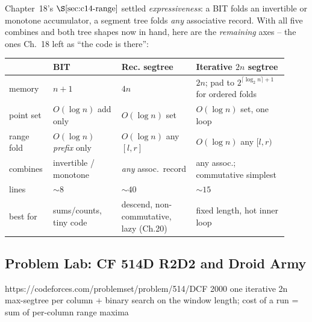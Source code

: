 \begin{comparisonbox}
Chapter~18's \(\secref{c14-range}\) settled \emph{expressiveness}: a BIT folds an
invertible or monotone accumulator, a segment tree folds \emph{any} associative
record.  With all five combines and both tree shapes now in hand, here are the
\emph{remaining} axes -- the ones Ch.~18 left as ``the code is there'':
\begin{center}\renewcommand{\arraystretch}{1.2}\footnotesize
\begin{tabular}{@{}p{0.115\linewidth} p{0.235\linewidth} p{0.255\linewidth} p{0.31\linewidth}@{}}
\toprule
 & \textbf{BIT} & \textbf{Rec. segtree} & \textbf{Iterative \(2n\) segtree}\\
\midrule
memory    & \(n{+}1\) & \(4n\) & \(2n\); pad to \(2^{\lceil\log_2 n\rceil{+}1}\) for ordered folds \\
point set & \(O(\log n)\) add only & \(O(\log n)\) set & \(O(\log n)\) set, one loop \\
range fold & \(O(\log n)\) \emph{prefix} only & \(O(\log n)\) any \([l,r]\) & \(O(\log n)\) any \([l,r)\) \\
combines  & invertible / monotone & \emph{any} assoc.\ record & any assoc.; commutative simplest \\
lines     & \(\sim\!8\) & \(\sim\!40\) & \(\sim\!15\) \\
best for  & sums/counts, tiny code & descend, non-commutative, lazy (Ch.20) & fixed length, hot inner loop \\
\bottomrule
\end{tabular}
\end{center}
\end{comparisonbox}

\subsection{Problem Lab: CF 514D R2D2 and Droid Army}

  {https://codeforces.com/problemset/problem/514/D}{CF 2000}
  {one iterative 2n max-segtree per column + binary search on the window length; cost of a run = sum of per-column range maxima}

